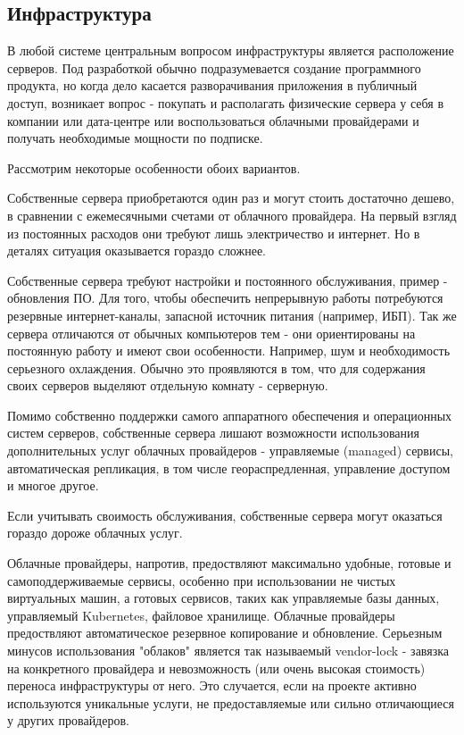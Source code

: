 
\subsection{Инфраструктура}

В любой системе центральным вопросом инфраструктуры является расположение серверов. Под разработкой обычно подразумевается создание программного продукта, но когда дело касается разворачивания приложения в публичный доступ, возникает вопрос - покупать и располагать физические сервера у себя в компании или дата-центре или воспользоваться облачными провайдерами и получать необходимые мощности по подписке.

Рассмотрим некоторые особенности обоих вариантов.

Собственные сервера приобретаются один раз и могут стоить достаточно дешево, в сравнении с ежемесячными счетами от облачного провайдера. На первый взгляд из постоянных расходов они требуют лишь электричество и интернет. Но в деталях ситуация оказывается гораздо сложнее.

Собственные сервера требуют настройки и постоянного обслуживания, пример - обновления ПО. Для того, чтобы обеспечить непрерывную работы потребуются резервные интернет-каналы, запасной источник питания (например, ИБП).
Так же сервера отличаются от обычных компьютеров тем - они ориентированы на постоянную работу и имеют свои особенности. Например, шум и необходимость серьезного охлаждения. Обычно это проявляются в том, что для содержания своих серверов выделяют отдельную комнату - серверную.

Помимо собственно поддержки самого аппаратного обеспечения и операционных систем серверов, собственные сервера лишают возможности использования дополнительных услуг облачных провайдеров - управляемые (managed) сервисы, автоматическая репликация, в том числе геораспредленная, управление доступом и многое другое.

Если учитывать своимость обслуживания, собственные сервера могут оказаться гораздо дороже облачных услуг.

Облачные провайдеры, напротив, предоствляют максимально удобные, готовые и самоподдерживаемые сервисы, особенно при использовании не чистых виртуальных машин, а готовых сервисов, таких как управляемые базы данных, управляемый Kubernetes, файловое хранилище. Облачные провайдеры предоствляют автоматическое резервное копирование и обновление. Серьезным минусов использования "облаков" является так называемый vendor-lock - завязка на конкретного провайдера и невозможность (или очень высокая стоимость) переноса инфраструктуры от него. Это случается, если на проекте активно используются уникальные услуги, не предоставляемые или сильно отличающиеся у других провайдеров.

